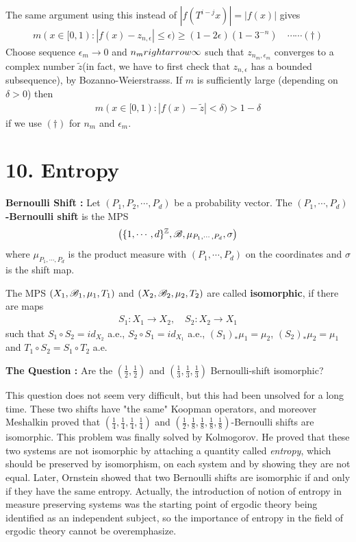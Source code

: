 \documentclass[12pt,a4paper]{report}
\begin{document}
\quad The same argument using this instead of $|f(T^{i-j}x)| = |f(x)|$ gives
\begin{align*}
m(x\in [0,1) : |f(x) - z_{n,\epsilon} | \leq \epsilon ) \geq (1-2\epsilon) (1-3^{-n}) \quad \cdots\cdots (\dagger)
\end{align*}
Choose sequence $\epsilon_m\rightarrow 0$ and $n_m\\rightarrow \infty$ such that $z_{n_m, \epsilon_m}$ converges to a complex number $\tilde{z}$(in fact, we have to first check that $z_{n,\epsilon}$ has a bounded subsequence), by Bozanno-Weierstrasss. If $m$ is sufficiently large (depending on $\delta >0$) then
\begin{align*}
m(x\in [0,1) : |f(x)-\tilde{z}| < \delta ) > 1-\delta
\end{align*}
if we use $(\dagger)$ for $n_m$ and $\epsilon_m$.

\section*{10. Entropy}

\textbf{Bernoulli Shift : } Let $(P_1, P_2,\cdots, P_d)$ be a probability vector. The \textbf{$(P_1, \cdots, P_d)$-Bernoulli shift} is the MPS
\begin{align*}
\big( \{1,\cdots, d\}^{\mathbb{Z}}, \mathscr{B}, \mu_{P_1,\cdots, P_d},\sigma \big)
\end{align*}
where $\mu_{P_1,\cdots, P_d}$ is the product measure with $(P_1,\cdots, P_d)$ on the coordinates and $\sigma$ is the shift map.
\s

 The MPS $(X_1, \mathscr{B}_1, \mu_1, T_1)$ and $(X_2,\mathscr{B}_2, \mu_2, T_2)$ are called \textbf{isomorphic}, if there are maps
\begin{align*}
S_1 : X_1\rightarrow X_2,\quad S_2 : X_2 \rightarrow X_1
\end{align*}
such that $S_1 \circ S_2 = id_{X_2}$ a.e., $S_2 \circ S_1 = id_{X_1}$ a.e., $(S_1)_* \mu_1 =\mu_2$, $(S_2)_* \mu_2 =\mu_1$ and $T_1 \circ S_2 = S_1 \circ T_2$ a.e.
\s

\textbf{The Question :} Are the $(\frac{1}{2}, \frac{1}{2})$ and $(\frac{1}{3},\frac{1}{3},\frac{1}{3})$ Bernoulli-shift isomorphic?
\s

This question does not seem very difficult, but this had been unsolved for a long time. These two shifts have "the same" Koopman operators, and moreover Meshalkin proved that $(\frac{1}{4},\frac{1}{4},\frac{1}{4},\frac{1}{4})$ and $(\frac{1}{2},\frac{1}{8},\frac{1}{8},\frac{1}{8},\frac{1}{8})$-Bernoulli shifts are isomorphic. This problem was finally solved by Kolmogorov. He proved that these two systems are not isomorphic by attaching a quantity called \emph{entropy}, which should be preserved by isomorphism, on each system and by showing they are not equal. Later, Ornstein showed that two Bernoulli shifts are isomorphic if and only if they have the same entropy. Actually, the introduction of notion of entropy in measure preserving systems was the starting point of ergodic theory being identified as an independent subject, so the importance of entropy in the field of ergodic theory cannot be overemphasize.
\s
\end{document}
